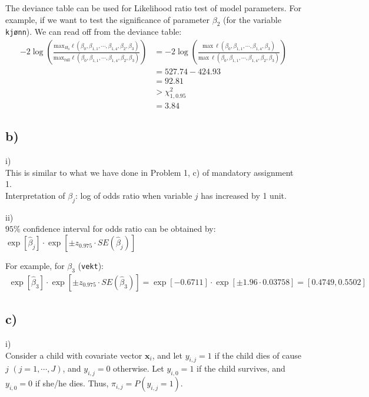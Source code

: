\documentclass[a4paper]{article}
\begin{document}
The deviance table can be used for Likelihood ratio test of model parameters. For example, if we want to test the significance of parameter $\beta_{2}$ (for the variable \texttt{kj{\o}nn}). We can read off from the deviance table:
\begin{align*}
-2\log\left(\frac{\mathrm{max}_{H_{0}}\ell\left(\beta_{0}, \beta_{1,1}, \cdots, \beta_{1,4}, \beta_{2}, \beta_{3}\right)}{\mathrm{max}_{\mathrm{full}}\ell\left(\beta_{0}, \beta_{1,1}, \cdots, \beta_{1,4}, \beta_{2}, \beta_{3}\right)}\right)
&= -2\log\left(\frac{\mathrm{max~}\ell\left(\beta_{0}, \beta_{1,1}, \cdots, \beta_{1,4}, \beta_{3}\right)}{\mathrm{max~}\ell\left(\beta_{0}, \beta_{1,1}, \cdots, \beta_{1,4}, \beta_{2}, \beta_{3}\right)}\right)\\
&= 527.74 - 424.93\\
&= 92.81\\
&> \chi_{1,0.95}^{2}\\
&= 3.84
\end{align*}


\vspace{\baselineskip}
\subsection{b)}
i)\\
This is similar to what we have done in  Problem 1, c) of mandatory assignment 1.\\
Interpretation of $\beta_{j}$: log of odds ratio when variable $j$ has increased by 1 unit.

ii)\\
$95\%$ confidence interval for odds ratio can be obtained by:\\
$\exp\left[\widehat{\beta}_{j}\right] \cdot \exp\left[\pm z_{0.975}\cdot SE(\widehat{\beta}_{j})\right]$

For example, for $\beta_{3}$ (\texttt{vekt}):
\begin{align*}
\exp\left[\widehat{\beta}_{3}\right] \cdot \exp\left[\pm z_{0.975}\cdot SE(\widehat{\beta}_{3})\right] = \exp\left[-0.6711\right] \cdot \exp\left[\pm 1.96\cdot 0.03758\right] = [0.4749, 0.5502]
\end{align*}


\vspace{\baselineskip}
\subsection{c)}
i)\\
Consider a child with covariate vector $\bm{x}_i$, and let $y_{i,j} = 1$ if the child dies of cause $j$ $(j = 1, \cdots, J)$, and $y_{i,j} = 0$ otherwise. Let $y_{i,0} = 1$ if the child survives, and $y_{i,0} = 0$ if she/he dies. Thus, $\pi_{i,j} = P(y_{i,j} = 1)$.\\
\end{document}
